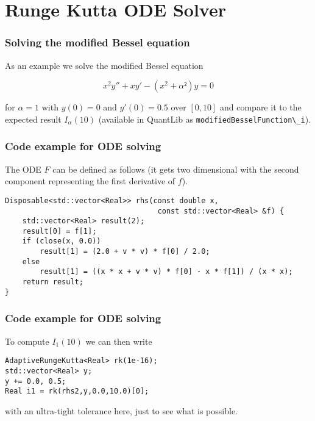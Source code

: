 \documentclass{beamer}
\begin{document}
\section{Runge Kutta ODE Solver}


\begin{frame}[fragile]
\frametitle{Solving the modified Bessel equation}
As an example we solve the modified Bessel equation

\begin{equation}
x^2y''+xy'-(x^2+\alpha²)y = 0
\end{equation}

for $\alpha=1$ with $y(0)=0$ and $y'(0)=0.5$ over $[0,10]$ and compare it to the expected result $I_\alpha(10)$ (available in QuantLib as \verb+modifiedBesselFunction\_i+).
\end{frame}

\begin{frame}[fragile]
\frametitle{Code example for ODE solving}
The ODE $F$ can be defined as follows (it gets two dimensional with the second component representing the first derivative of $f$).
\vspace{2mm}
\begin{verbatim}
Disposable<std::vector<Real>> rhs(const double x, 
                                   const std::vector<Real> &f) {
    std::vector<Real> result(2);
    result[0] = f[1];
    if (close(x, 0.0))
        result[1] = (2.0 + v * v) * f[0] / 2.0;
    else
        result[1] = ((x * x + v * v) * f[0] - x * f[1]) / (x * x);
    return result;
}
\end{verbatim}

\end{frame}

\begin{frame}[fragile]
\frametitle{Code example for ODE solving}
To compute $I_1(10)$ we can then write
\vspace{2mm}
\begin{verbatim}
AdaptiveRungeKutta<Real> rk(1e-16);
std::vector<Real> y;
y += 0.0, 0.5;
Real i1 = rk(rhs2,y,0.0,10.0)[0];
\end{verbatim}
\vspace{2mm}
with an ultra-tight tolerance here, just to see what is possible.
\end{frame}
\end{document}
